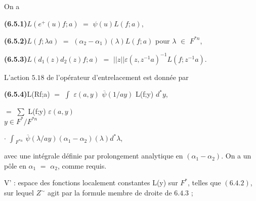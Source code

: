 \documentclass[10pt,a4paper]{article}
\begin{document}
\clearpage
{}
\label{d035-physical-030}
\par On a\par
\par\noindent\textbf{(6.5.1)}\quad $L(e^+(u)f;a)$ $=$ $\psi{}(u)L(f;a)$,\par
\par\noindent\textbf{(6.5.2)}\quad $L(f;\lambda{}a)$ $=$ $(\alpha{}_2-\alpha{}_1)(\lambda{})L(f;a)$ pour $\lambda{}$ $\in{}$ $F^{*n}$,\par
\par\noindent\textbf{(6.5.3)}\quad $L(d_1(z)d_2(z)f;a)$ $=$ $||z||\varepsilon{}(z,z^{-1}a)^{-1}L(f;z^{-1}a)$.\par
\par L'action $5.18$ de l'opérateur d'entrelacement est donnée par\par
\par\noindent\textbf{(6.5.4)}\quad L(Rf;a) $=$ $\int{}$ $\varepsilon{}(a,y)$ $\overline{\psi{}}(1/ay)$ L(f;y) $d^*y$,\par
\par\smallskip\begin{center}\begin{minipage}{0.96\textwidth}\centering
$=$ $\sum{}$ L(f;y) $\varepsilon{}(a,y)$ \\ $y\in{}F^*/F^{*n}$
\end{minipage}\end{center}\smallskip
\par\smallskip\begin{center}\begin{minipage}{0.96\textwidth}\centering
$\cdot{}$ $\int{}_{F^{*n}}$ $\overline{\psi{}}(\lambda{}/ay)(\alpha{}_1-\alpha{}_2)(\lambda{})d^*\lambda{}$,
\end{minipage}\end{center}\smallskip
\par avec une intégrale définie par prolongement analytique en $(\alpha{}_1-\alpha{}_2)$. On a un pôle en $\alpha{}_1$ $=$ $\alpha{}_2$, comme requis.\par
\par\medskip{}\par\smallskip
\par V' : espace des fonctions localement constantes L(y) sur $F^*$, telles que $(6.4.2)$, sur lequel $Z^\sim$ agit par la formule membre de droite de $6.4.3$ ;\par
\end{document}
